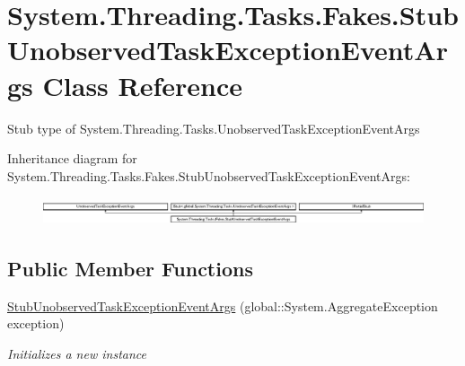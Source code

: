 \hypertarget{class_system_1_1_threading_1_1_tasks_1_1_fakes_1_1_stub_unobserved_task_exception_event_args}{\section{System.\-Threading.\-Tasks.\-Fakes.\-Stub\-Unobserved\-Task\-Exception\-Event\-Args Class Reference}
\label{class_system_1_1_threading_1_1_tasks_1_1_fakes_1_1_stub_unobserved_task_exception_event_args}
}


Stub type of System.\-Threading.\-Tasks.\-Unobserved\-Task\-Exception\-Event\-Args 


Inheritance diagram for System.\-Threading.\-Tasks.\-Fakes.\-Stub\-Unobserved\-Task\-Exception\-Event\-Args\-:\begin{figure}[H]
\begin{center}
\leavevmode
\includegraphics[height=0.813362cm]{class_system_1_1_threading_1_1_tasks_1_1_fakes_1_1_stub_unobserved_task_exception_event_args}
\end{center}
\end{figure}
\subsection*{Public Member Functions}
\begin{DoxyCompactItemize}
\item 
\hyperlink{class_system_1_1_threading_1_1_tasks_1_1_fakes_1_1_stub_unobserved_task_exception_event_args_aa6fdc632ff0a0b1f2a51a0514ff9c7c1}{Stub\-Unobserved\-Task\-Exception\-Event\-Args} (global\-::\-System.\-Aggregate\-Exception exception)
\begin{DoxyCompactList}\small\item\em Initializes a new instance\end{DoxyCompactList}\end{DoxyCompactItemize}
